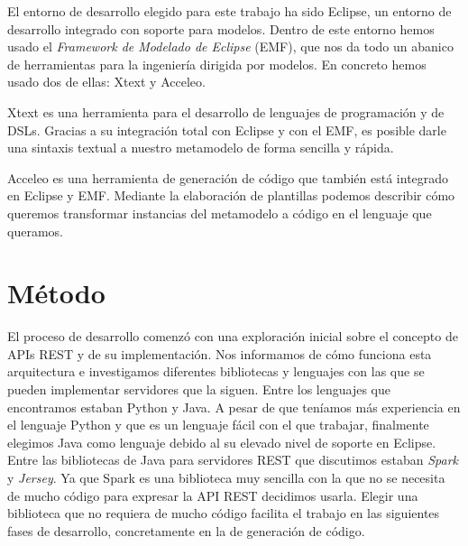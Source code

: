 \documentclass[runningheads]{llncs}
\begin{document}


El entorno de desarrollo elegido para este trabajo ha sido Eclipse, un
entorno de desarrollo integrado con soporte para modelos. Dentro de este
entorno hemos usado el \emph{Framework de Modelado de Eclipse} (EMF),
que nos da todo un abanico de herramientas para la ingeniería dirigida
por modelos. En concreto hemos usado dos de ellas: Xtext y Acceleo.

Xtext es una herramienta para el desarrollo de lenguajes de programación
y de DSLs. Gracias a su integración total con Eclipse y con el EMF,
es posible darle una sintaxis textual a nuestro metamodelo de forma
sencilla y rápida.

Acceleo es una herramienta de generación de código que también está
integrado en Eclipse y EMF. Mediante la elaboración de plantillas
podemos describir cómo queremos transformar instancias del metamodelo
a código en el lenguaje que queramos.

\section{Método}
\label{sc:metodo}

%

El proceso de desarrollo comenzó con una exploración inicial sobre
el concepto de APIs REST y de su implementación. Nos informamos de
cómo funciona esta arquitectura e investigamos diferentes bibliotecas
y lenguajes con las que se pueden implementar servidores que la siguen.
Entre los lenguajes que encontramos estaban Python y Java. A pesar de que
teníamos más experiencia en el lenguaje Python y que es un lenguaje
fácil con el que trabajar, finalmente elegimos Java como lenguaje
debido al su elevado nivel de soporte en Eclipse. Entre las bibliotecas
de Java para servidores REST que discutimos estaban \emph{Spark} y
\emph{Jersey}. Ya que Spark es una biblioteca muy sencilla con la que
no se necesita de mucho código para expresar la API REST decidimos
usarla. Elegir una biblioteca que no requiera de mucho código facilita
el trabajo en las siguientes fases de desarrollo, concretamente en la
de generación de código.
\end{document}
